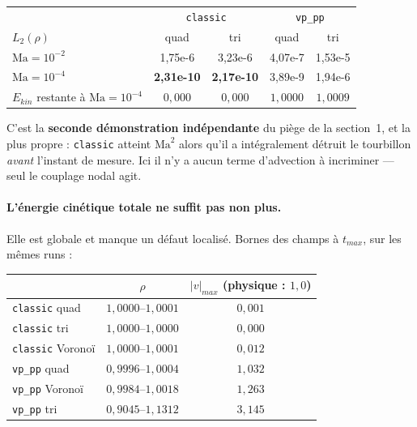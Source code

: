 \documentclass[11pt,a4paper]{article}
\begin{document}
\begin{table}[h]\centering
\begin{tabular}{lcccc}
\toprule
& \multicolumn{2}{c}{\texttt{classic}} & \multicolumn{2}{c}{\texttt{vp\_pp}} \\
$L_2(\rho)$ & quad & tri & quad & tri \\
\midrule
$\mathrm{Ma}=10^{-2}$ & 1{,}75e-6 & 3{,}23e-6 & 4{,}07e-7 & 1{,}53e-5 \\
$\mathrm{Ma}=10^{-4}$ & \textbf{2{,}31e-10} & \textbf{2{,}17e-10} & 3{,}89e-9 & 1{,}94e-6 \\
\midrule
$E_{kin}$ restante à $\mathrm{Ma}=10^{-4}$ & \textcolor{BrickRed}{$0{,}000$} & \textcolor{BrickRed}{$0{,}000$} & $1{,}0000$ & $1{,}0009$ \\
\bottomrule
\end{tabular}
\end{table}

\noindent
C'est la \textbf{seconde démonstration indépendante} du piège de la section~1, et la plus
propre : \texttt{classic} atteint $\mathrm{Ma}^2$ alors qu'il a intégralement détruit le
tourbillon \emph{avant} l'instant de mesure. Ici il n'y a aucun terme d'advection à
incriminer --- seul le couplage nodal agit.

\paragraph{L'énergie cinétique totale ne suffit pas non plus.} Elle est globale et
manque un défaut localisé. Bornes des champs à $t_{max}$, sur les mêmes runs :

\begin{table}[h]\centering
\begin{tabular}{lcc}
\toprule
 & $\rho$ & $|v|_{max}$ (physique : $1{,}0$) \\
\midrule
\texttt{classic} quad & $1{,}0000$--$1{,}0001$ & \textcolor{BrickRed}{$0{,}001$} \\
\texttt{classic} tri  & $1{,}0000$--$1{,}0000$ & \textcolor{BrickRed}{$0{,}000$} \\
\texttt{classic} Voronoï & $1{,}0000$--$1{,}0001$ & \textcolor{BrickRed}{$0{,}012$} \\
\midrule
\texttt{vp\_pp} quad & $0{,}9996$--$1{,}0004$ & $1{,}032$ \\
\texttt{vp\_pp} Voronoï & $0{,}9984$--$1{,}0018$ & $1{,}263$ \\
\texttt{vp\_pp} tri  & \textcolor{BrickRed}{$0{,}9045$--$1{,}1312$} & \textcolor{BrickRed}{$3{,}145$} \\
\bottomrule
\end{tabular}
\end{table}
\end{document}
